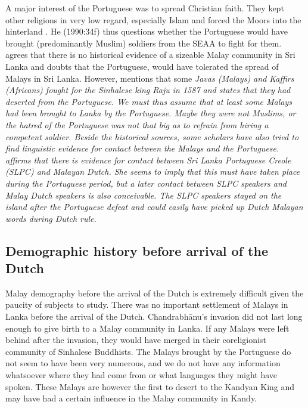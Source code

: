 A major interest of the Portuguese was to spread Christian faith.
They kept other religions in very low regard, especially Islam and
forced the Moors into the hinterland \citep[42]{Hussainmiya1990}.
He (1990:34f) thus questions whether the Portuguese would have
brought (predominantly Muslim) soldiers from the SEAA to fight for
them. \citet[6f.]{Bichsel} agrees that there is no historical
evidence of a sizeable Malay community in Sri Lanka and doubts
that the Portuguese, would have tolerated the spread of Malays in
Sri Lanka. However, \citep[26]{Powell1973} mentions that some \em
Javas \em (Malays) and \em Kaffirs \em (Africans) fought for the
Sinhalese king Raju in 1587 and states that they had deserted from
the Portuguese. We must thus assume that at least some Malays had
been brought to Lanka by the Portuguese. Maybe they were not
Muslims, or the hatred of the Portuguese was not that big as to
refrain from hiring a competent soldier. Beside the historical
sources, some scholars have also tried to find linguistic evidence
for contact between the Malays and the Portuguese.
 \citet[5f]{Jayasuriya2002} affirms that there is evidence for contact between Sri Lanka Portuguese Creole (SLPC) and Malayan Dutch. She seems to imply that this must have taken place during the Portuguese period, but a later contact between SLPC speakers and Malay Dutch speakers is also conceivable. The SLPC speakers stayed on the island after the Portuguese defeat and could easily have picked up Dutch Malayan words during Dutch rule.


\subsection{Demographic history before arrival of the Dutch}\label{sec:slmbg:DemographichistorybeforearrivaloftheDutch}
Malay demography before the arrival of the Dutch is extremely difficult given the paucity of subjects to study. There
was no important settlement of Malays in Lanka before the arrival
of the Dutch. Chandrabh\=anu's invasion did not last long enough
to give birth to a Malay community in Lanka. If any Malays were
left behind after the invasion, they would have merged in their
coreligionist community of Sinhalese Buddhists. The Malays brought
by the Portuguese do not seem to have been very numerous, and we
do not have any information whatsoever where they had come from or
what languages they might have spoken. These Malays are however
the first to desert to the Kandyan King and may have had a certain
influence in the Malay community in Kandy.



